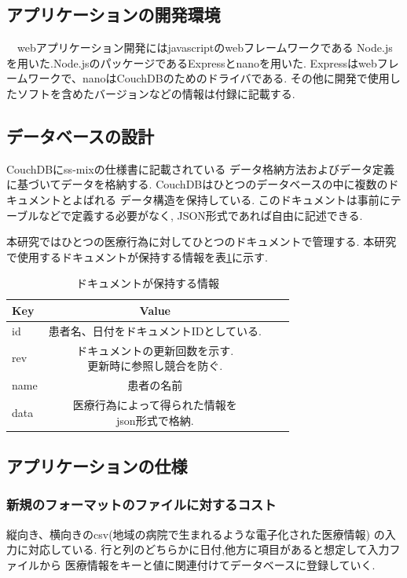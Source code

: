 \subsection{アプリケーションの開発環境}
　webアプリケーション開発にはjavascriptのwebフレームワークである
Node.jsを用いた.Node.jsのパッケージであるExpressとnanoを用いた.
Expressはwebフレームワークで、nanoはCouchDBのためのドライバである.
その他に開発で使用したソフトを含めたバージョンなどの情報は付録に記載する.


\subsection{データベースの設計}
	CouchDBにss-mixの仕様書に記載されている
	データ格納方法およびデータ定義\cite{bibi1}に基づいてデータを格納する.
	CouchDBはひとつのデータベースの中に複数のドキュメントとよばれる
	データ構造を保持している.
	このドキュメントは事前にテーブルなどで定義する必要がなく,
	JSON形式であれば自由に記述できる.

	本研究ではひとつの医療行為に対してひとつのドキュメントで管理する.
	本研究で使用するドキュメントが保持する情報を表\ref{tab:doc}に示す.


	\begin{table}[htb]
		\begin{center}
			\caption{ドキュメントが保持する情報}
			\begin{tabular}{|l|c|r|r|}\hline
			Key & Value \\ \hline \hline
			id &  患者名、日付をドキュメントIDとしている. \\ \hline
			rev & \shortstack{ドキュメントの更新回数を示す. \\ 更新時に参照し競合を防ぐ.} \\ \hline
			name & 患者の名前 \\ \hline
			data & \shortstack{医療行為によって得られた情報を \\ json形式で格納.} \\ \hline
			\end{tabular}
			\label{tab:doc}
		\end{center}
	\end{table}


\subsection{アプリケーションの仕様}

	\subsubsection{新規のフォーマットのファイルに対するコスト}
	縦向き、横向きのcsv(地域の病院で生まれるような電子化された医療情報)
	の入力に対応している.
	行と列のどちらかに日付,他方に項目があると想定して入力ファイルから
	医療情報をキーと値に関連付けてデータベースに登録していく.

